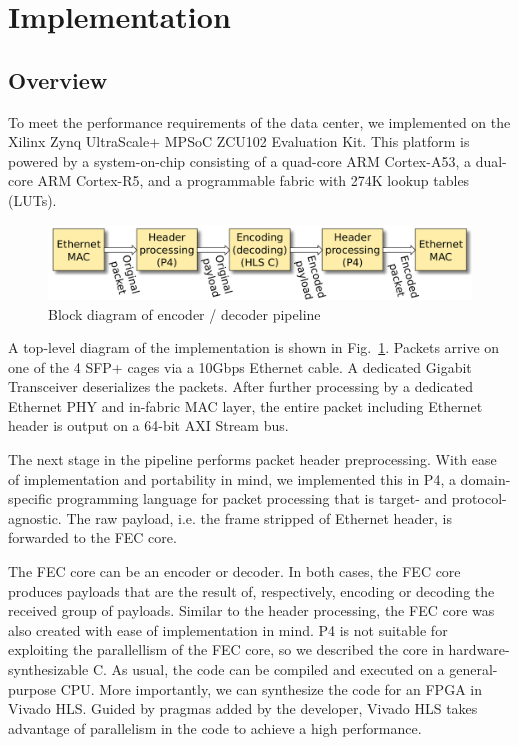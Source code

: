 \section{Implementation}
\label{sec:implementation}

\subsection{Overview}

To meet the performance requirements of the data center, we implemented \OurSys
on the Xilinx Zynq UltraScale+ MPSoC ZCU102 Evaluation Kit.  This platform is
powered by a system-on-chip consisting of a quad-core ARM Cortex-A53, a
dual-core ARM Cortex-R5, and a programmable fabric with 274K lookup tables
(LUTs).

\begin{figure}
  \centering
  \includegraphics[width=0.4\paperwidth]{Top_level.pdf}
  \caption{\label{fig:toplevel} Block diagram of encoder / decoder pipeline}
\end{figure}

A top-level diagram of the implementation is shown in Fig.~\ref{fig:toplevel}.
Packets arrive on one of the 4 SFP+ cages via a 10Gbps Ethernet cable.
A dedicated Gigabit Transceiver deserializes the packets.  After further
processing by a dedicated Ethernet PHY and in-fabric MAC layer, the entire
packet including Ethernet header is output on a 64-bit AXI Stream bus.

The next stage in the pipeline performs packet header preprocessing.  With
ease of implementation and portability in mind, we implemented this in P4, a
domain-specific programming language for packet processing that is target- and
protocol-agnostic.  The raw payload, i.e. the frame stripped of Ethernet
header, is forwarded to the FEC core.

The FEC core can be an encoder or decoder.  In both cases, the FEC core
produces payloads that are the result of, respectively, encoding or decoding
the received group of payloads.  Similar to the header processing, the FEC core
was also created with ease of implementation in mind.  P4 is not suitable for
exploiting the parallellism of the FEC core, so we described the core in
hardware-synthesizable C.  As usual, the code can be compiled and executed on a
general-purpose CPU.  More importantly, we can synthesize the code for an FPGA
in Vivado HLS.  Guided by pragmas added by the developer, Vivado HLS takes
advantage of parallelism in the code to achieve a high performance.

